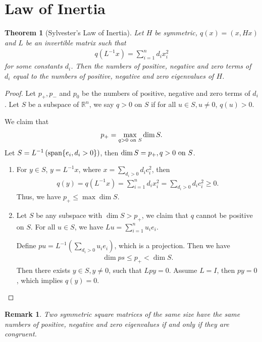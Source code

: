 \documentclass[11pt]{book}
\newtheorem{theorem}{Theorem}[section]
\newtheorem{remark}{Remark}[section]
\theoremstyle{definition}
\numberwithin{equation}{chapter}
\begin{document}
\section{Law of Inertia}
\begin{theorem}[Sylvester’s Law of Inertia]\label{Law_of_Inertia}
Let $H$ be symmetric, $q(x) = (x, Hx)$ and $L$ be an invertible matrix such that
\begin{align*}
    q\left(L^{-1}x\right) = \sum^n_{i=1} d_i x_i^2
\end{align*}
for some constants $d_i$. Then the numbers of positive, negative and zero terms of $d_i$ equal to the numbers of positive, negative and zero eigenvalues of $H$.
\end{theorem}
\begin{proof}
Let $p_+, p_-$ and $p_0$ be the numbers of positive, negative and zero terms of $d_i$. Let $S$ be a subspace of $\mathbb{R}^n$, we say $q > 0$ on $S$ if for all $u\in S, u\neq 0$, $q(u) > 0$.

We claim that $$p_+ = \max_{q > 0\,\, {\rm on}\,\, S} \dim S. $$
Let $S = L^{-1}\left({\rm span}\{e_i, d_i > 0\} \right)$, then $
\dim S = p_+, q > 0\,\, {\rm on}\,\, S$. 
\begin{enumerate}[label=(\alph*)]
    \item For $y\in S$, $y = L^{-1}x$, where $x = \sum_{d_i > 0} d_i c_i^2$, then 
    \begin{align*}
        q(y) = q\left(L^{-1}x\right) = \sum^n_{i=1} d_i x_i^2 = \sum_{d_i > 0} d_i c_i^2 \geq 0.
    \end{align*}
    Thus, we have $p_+ \leq \max \dim S$.
    \item Let $S$ be any subspace with $\dim S > p_+$, we claim that $q$ cannot be positive on $S$. For all $u\in S$, we have $Lu = \sum^n_{i=1}u_i e_i$. 
    
    Define $pu = L^{-1}\left(\sum_{d_i>0}u_i e_i \right)$, which is a projection. Then we have
    \begin{align*}
        \dim ps \leq p_+ < \dim S.
    \end{align*}
    Then there exists $y\in S, y\neq 0$, such that $Lpy = 0$. Assume $L = I$, then $py = 0$, which implies $q(y) = 0$. 
\end{enumerate}
\end{proof}

\begin{remark}
Two symmetric square matrices of the same size have the same
numbers of positive, negative and zero eigenvalues if and only if they are congruent.
\end{remark}
\end{document}
